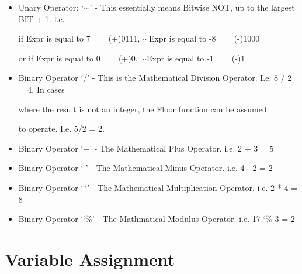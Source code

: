 \documentclass[a4wide, 11pt]{article}
\begin{document}
\begin{itemize}

\item
Unary Operator: `$\sim$' - This essentially means Bitwise NOT, up to the largest BIT + 1. i.e. 

\vspace{0.75mm} \hspace{25mm} \hspace{12mm} if Expr is equal to 7 == (+)0111, $\sim$Expr is equal to -8 == (-)1000

\vspace{0.75mm} \hspace{25mm} \hspace{12mm} or if Expr is equal to  0 == (+)0, $\sim$Expr is equal to -1 == (-)1
\item
Binary Operator `/' \hspace{2mm}- This is the Mathematical Division Operator. I.e. 8 / 2 = 4. In cases 

\vspace{0.75mm} \hspace{25mm} \hspace{12mm} where the result is not an integer, the Floor function can be assumed

\vspace{0.75mm} \hspace{25mm} \hspace{12mm} to operate. I.e. 5/2 = 2.
\item
Binary Operator `+' \hspace{1mm}- The Mathematical Plus Operator. i.e. 2 + 3 = 5
\item 
Binary Operator `-'\hspace{3mm} - The Mathematical Minus Operator. i.e. 4 - 2 = 2
\item
Binary Operator `*'\hspace{2.5mm} - The Mathematical Multiplication Operator. i.e. 2 * 4 = 8
\item
Binary Operator `\char`\%'\hspace{1mm} - The Mathmatical Modulus Operator. i.e.  17 \char`\%\hspace{0.57mm} 3 = 2

\end{itemize}


\section{Variable Assignment}
\end{document}

